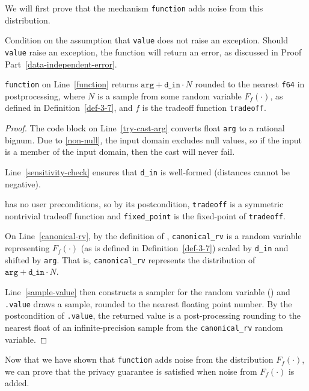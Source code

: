\documentclass{article}
\begin{document}
We will first prove that the mechanism \texttt{function} adds noise from this distribution.
\begin{lemma}
    \label{function-correctness}
    Condition on the assumption that \texttt{value} does not raise an exception.
    Should \texttt{value} raise an exception, the function will return an error, as discussed in Proof Part~\ref{data-independent-error}.

    \texttt{function} on Line~\ref{function} returns $\texttt{arg} + \texttt{d\_in} \cdot N$ 
    rounded to the nearest \texttt{f64} in postprocessing,
    where $N$ is a sample from some random variable $F_f(\cdot)$, as defined in Definition~\ref{def-3-7},
    and $f$ is the tradeoff function \texttt{tradeoff}.
\end{lemma}

\begin{proof}
The code block on Line~\ref{try-cast-arg} converts float \texttt{arg} to a rational bignum.
Due to \ref{non-null}, the input domain excludes null values, 
so if the input is a member of the input domain, then the cast will never fail.

Line~\ref{sensitivity-check} ensures that \texttt{d\_in} is well-formed (distances cannot be negative).
    
 has no user preconditions,
so by its postcondition, \texttt{tradeoff} is a symmetric nontrivial tradeoff function
and \texttt{fixed\_point} is the fixed-point of \texttt{tradeoff}.

On Line~\ref{canonical-rv}, by the definition of ,
\texttt{canonical\_rv} is a random variable representing $F_f(\cdot)$ (as is defined in Definition~\ref{def-3-7}) 
scaled by \texttt{d\_in} and shifted by \texttt{arg}.
That is, \texttt{canonical\_rv} represents the distribution of $\texttt{arg} + \texttt{d\_in} \cdot N$.

Line~\ref{sample-value} then constructs a sampler for the random variable ()
and \texttt{.value} draws a sample, rounded to the nearest floating point number.
By the postcondition of \texttt{.value}, 
the returned value is a post-processing rounding to the nearest float
of an infinite-precision sample from the \texttt{canonical\_rv} random variable.
\end{proof}

Now that we have shown that \texttt{function} adds noise from the distribution $F_f(\cdot)$,
we can prove that the privacy guarantee is satisfied when noise from $F_f(\cdot)$ is added.
\end{document}
